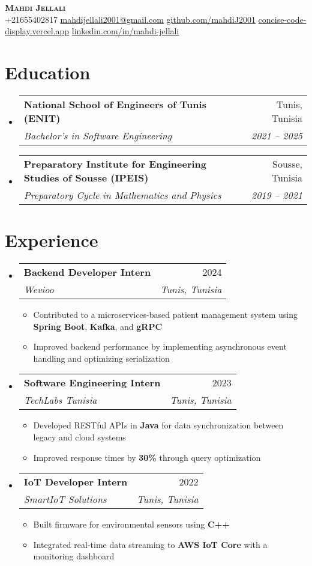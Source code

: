 \documentclass[letterpaper,11pt]{article}
\makeatletter
\newcommand{\resumeItem}[1]{
    \item\small{
            {#1 \vspace{-2pt}}
    }
}
\newcommand{\resumeSubheading}[4]{
    \vspace{-2pt}\item
    \begin{tabular*}{0.97\textwidth}[t]{l@{\extracolsep{\fill}}r}
    \textbf{#1} & #2 \\
    \textit{\small#3} & \textit{\small #4} \\
    \end{tabular*}\vspace{-7pt}
}
\newcommand{\resumeSubHeadingListStart}{\begin{itemize}[leftmargin=0.15in, label={}]}
\newcommand{\resumeSubHeadingListEnd}{\end{itemize}}
\newcommand{\resumeItemListStart}{\begin{itemize}}
\newcommand{\resumeItemListEnd}{\end{itemize}\vspace{-5pt}}
\makeatother
\begin{document}
\begin{center}
\textbf{\Huge \scshape Mahdi Jellali} \\ \vspace{1pt}
\small
+21655402817 \quad
\href{mailto:mahdijellali2001@gmail.com}{mahdijellali2001@gmail.com} \quad
\href{https://github.com/mahdiJ2001}{github.com/mahdiJ2001} \quad
\href{https://concise-code-display.vercel.app/}{concise-code-display.vercel.app} \quad
\href{https://www.linkedin.com/in/mahdi-jellali/}{linkedin.com/in/mahdi-jellali}
\end{center}

\vspace{10pt}
\section{Education}
\resumeSubHeadingListStart
\resumeSubheading
{National School of Engineers of Tunis (ENIT)}{Tunis, Tunisia}
{Bachelor's in Software Engineering}{2021 -- 2025}
\resumeSubheading
{Preparatory Institute for Engineering Studies of Sousse (IPEIS)}{Sousse, Tunisia}
{Preparatory Cycle in Mathematics and Physics}{2019 -- 2021}
\resumeSubHeadingListEnd

\section{Experience}
\resumeSubHeadingListStart
\resumeSubheading
{Backend Developer Intern}{2024}
{Wevioo}{Tunis, Tunisia}
\resumeItemListStart
\resumeItem{Contributed to a microservices-based patient management system using \textbf{Spring Boot}, \textbf{Kafka}, and \textbf{gRPC}}
\resumeItem{Improved backend performance by implementing asynchronous event handling and optimizing serialization}
\resumeItemListEnd
\resumeSubheading
{Software Engineering Intern}{2023}
{TechLabs Tunisia}{Tunis, Tunisia}
\resumeItemListStart
\resumeItem{Developed RESTful APIs in \textbf{Java} for data synchronization between legacy and cloud systems}
\resumeItem{Improved response times by \textbf{30\%} through query optimization}
\resumeItemListEnd
\resumeSubheading
{IoT Developer Intern}{2022}
{SmartIoT Solutions}{Tunis, Tunisia}
\resumeItemListStart
\resumeItem{Built firmware for environmental sensors using \textbf{C++}}
\resumeItem{Integrated real-time data streaming to \textbf{AWS IoT Core} with a monitoring dashboard}
\resumeItemListEnd
\resumeSubHeadingListEnd

\end{document}
